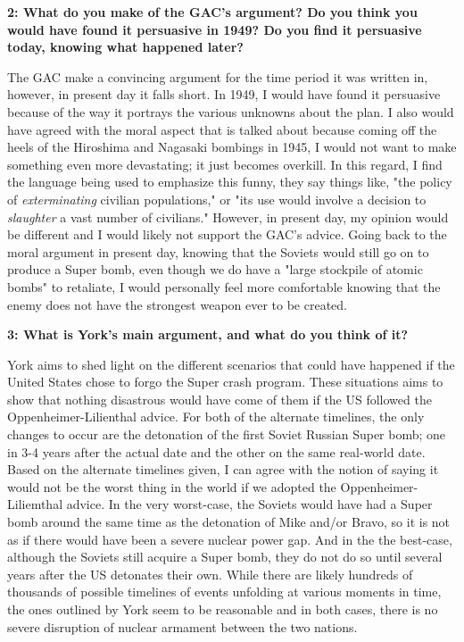 \documentclass[12pt]{turabian-researchpaper}
\newcommand\question[2]{\noindent\textbf{#1: #2}}
\begin{document}
	\question{2}{What do you make of the GAC's argument? Do you think you would have found it persuasive in 1949? Do you find it persuasive today, knowing what happened later?}

	The GAC make a convincing argument for the time period it was written in, however, in present day it falls short. In 1949, I would have found it persuasive because of the way it portrays the various unknowns about the plan. I also would have agreed with the moral aspect that is talked about because coming off the heels of the Hiroshima and Nagasaki bombings in 1945, I would not want to make something even more devastating; it just becomes overkill. In this regard, I find the language being used to emphasize this funny, they say things like, "the policy of \textit{exterminating} civilian populations," or "its use would involve a decision to \textit{slaughter} a vast number of civilians." However, in present day, my opinion would be different and I would likely not support the GAC's advice. Going back to the moral argument in present day, knowing that the Soviets would still go on to produce a Super bomb, even though we do have a "large stockpile of atomic bombs" to retaliate, I would personally feel more comfortable knowing that the enemy does not have the strongest weapon ever to be created.

	\question{3}{What is York's main argument, and what do you think of it?}

	York aims to shed light on the different scenarios that could have happened if the United States chose to forgo the Super crash program. These situations aims to show that nothing disastrous would have come of them if the US followed the Oppenheimer-Lilienthal advice. For both of the alternate timelines, the only changes to occur are the detonation of the first Soviet Russian Super bomb; one in 3-4 years after the actual date and the other on the same real-world date. Based on the alternate timelines given, I can agree with the notion of saying it would not be the worst thing in the world if we adopted the Oppenheimer-Liliemthal advice. In the very worst-case, the Soviets would have had a Super bomb around the same time as the detonation of Mike and/or Bravo, so it is not as if there would have been a severe nuclear power gap. And in the the best-case, although the Soviets still acquire a Super bomb, they do not do so until several years after the US detonates their own. While there are likely hundreds of thousands of possible timelines of events unfolding at various moments in time, the ones outlined by York seem to be reasonable and in both cases, there is no severe disruption of nuclear armament between the two nations.
\end{document}
